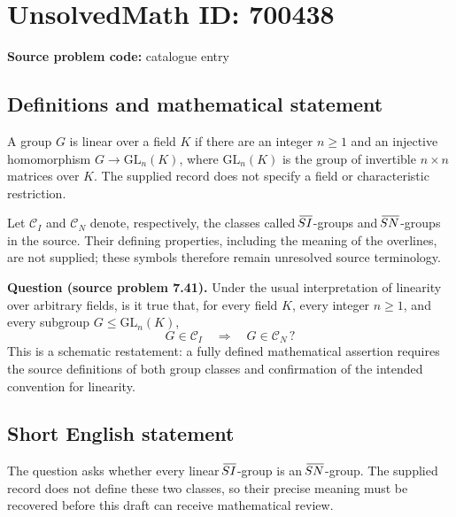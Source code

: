 \documentclass[11pt]{article}
\begin{document}
\section*{UnsolvedMath ID: 700438}
\textbf{Source problem code:} catalogue entry
\subsection{Definitions and mathematical statement}
A group \(G\) is linear over a field \(K\) if there are an integer \(n\geq 1\) and an injective homomorphism \(G\to\mathrm{GL}_n(K)\), where \(\mathrm{GL}_n(K)\) is the group of invertible \(n\times n\) matrices over \(K\). The supplied record does not specify a field or characteristic restriction.

Let \(\mathcal C_I\) and \(\mathcal C_N\) denote, respectively, the classes called \(\overline{\!SI\vphantom{(}}\)-groups and \(\overline{\!SN\vphantom{(}}\)-groups in the source. Their defining properties, including the meaning of the overlines, are not supplied; these symbols therefore remain unresolved source terminology.

\textbf{Question (source problem 7.41).} Under the usual interpretation of linearity over arbitrary fields, is it true that, for every field \(K\), every integer \(n\geq1\), and every subgroup \(G\leq\mathrm{GL}_n(K)\),
\[
G\in\mathcal C_I\quad\Longrightarrow\quad G\in\mathcal C_N\,?
\]
This is a schematic restatement: a fully defined mathematical assertion requires the source definitions of both group classes and confirmation of the intended convention for linearity.
\subsection{Short English statement}
The question asks whether every linear \(\overline{\!SI\vphantom{(}}\)-group is an \(\overline{\!SN\vphantom{(}}\)-group. The supplied record does not define these two classes, so their precise meaning must be recovered before this draft can receive mathematical review.
\end{document}
